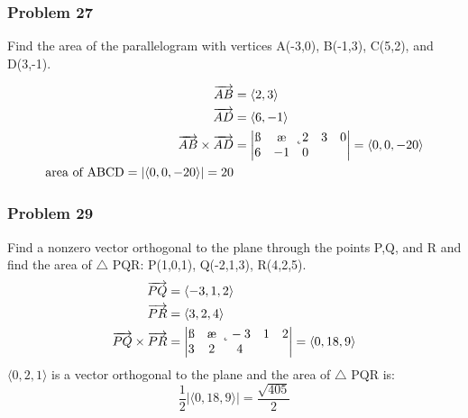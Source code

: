 \documentclass[letterpaper, 12pt]{math}
\begin{document}
\subsubsection*{Problem 27}
Find the area of the parallelogram with vertices A(-3,0), B(-1,3), C(5,2), and
D(3,-1).
\begin{center}
\end{center}
\begin{align*}
  \overrightarrow{AB} &= \langle2,3\rangle \\
  \overrightarrow{AD} &= \langle6,-1\rangle \\
  \overrightarrow{AB}\times\overrightarrow{AD} &= \begin{vmatrix}
    \i & \j & \k \\
    2 & 3 & 0 \\
    6 & -1 & 0 \\
  \end{vmatrix} = \langle0,0,-20\rangle \\
  \text{area of ABCD} = |\langle0,0,-20\rangle| = 20
\end{align*}

\subsubsection*{Problem 29}
Find a nonzero vector orthogonal to the plane through the points P,Q, and R and
find the area of \( \triangle \) PQR: P(1,0,1), Q(-2,1,3), R(4,2,5).
\begin{align*}
  \overrightarrow{PQ} &= \langle-3,1,2\rangle \\
  \overrightarrow{PR} &= \langle3,2,4\rangle \\
  \overrightarrow{PQ}\times\overrightarrow{PR} &= \begin{vmatrix}
    \i & \j & \k \\
    -3 & 1 & 2 \\
    3 & 2 & 4
  \end{vmatrix} = \langle0,18,9\rangle
\end{align*}
\( \langle0,2,1\rangle \) is a vector orthogonal to the plane and the area of
\( \triangle \) PQR is:
\[ \frac{1}{2}|\langle0,18,9\rangle| = \frac{\sqrt{405}}{2} \]
\end{document}
